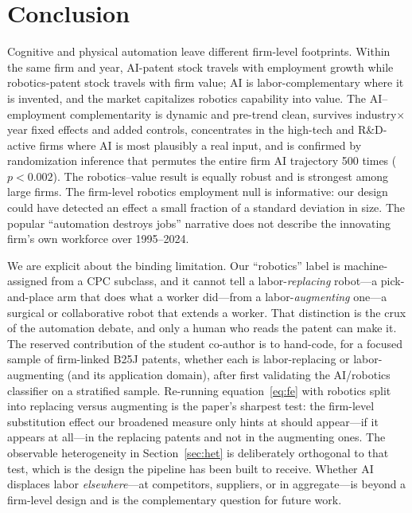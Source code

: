 \documentclass[12pt]{article}
\begin{document}
\section{Conclusion}\label{sec:concl}
Cognitive and physical automation leave different firm-level footprints. Within the same firm and
year, AI-patent stock travels with employment growth while robotics-patent stock travels with firm
value; AI is labor-complementary where it is invented, and the market capitalizes robotics
capability into value. The AI--employment complementarity is dynamic and pre-trend clean, survives
industry$\times$year fixed effects and added controls, concentrates in the high-tech and
R\&D-active firms where AI is most plausibly a real input, and is confirmed by randomization
inference that permutes the entire firm AI trajectory 500 times ($p<0.002$). The robotics--value
result is equally robust and is strongest among large firms. The firm-level robotics employment
null is informative: our design could have detected an effect a small fraction of a standard
deviation in size. The popular ``automation destroys jobs'' narrative does not describe the
innovating firm's own workforce over 1995--2024.

We are explicit about the binding limitation. Our ``robotics'' label is machine-assigned from a
CPC subclass, and it cannot tell a labor-\emph{replacing} robot---a pick-and-place arm that does
what a worker did---from a labor-\emph{augmenting} one---a surgical or collaborative robot that
extends a worker. That distinction is the crux of the automation debate, and only a human who
reads the patent can make it. The reserved contribution of the student co-author is to hand-code,
for a focused sample of firm-linked B25J patents, whether each is labor-replacing or
labor-augmenting (and its application domain), after first validating the AI/robotics classifier
on a stratified sample. Re-running equation~\eqref{eq:fe} with robotics split into replacing
versus augmenting is the paper's sharpest test: the firm-level substitution effect our broadened
measure only hints at should appear---if it appears at all---in the replacing patents and not in
the augmenting ones. The observable heterogeneity in Section~\ref{sec:het} is deliberately
orthogonal to that test, which is the design the pipeline has been built to receive. Whether AI
displaces labor \emph{elsewhere}---at competitors, suppliers, or in aggregate---is beyond a
firm-level design and is the complementary question for future work.
\end{document}
